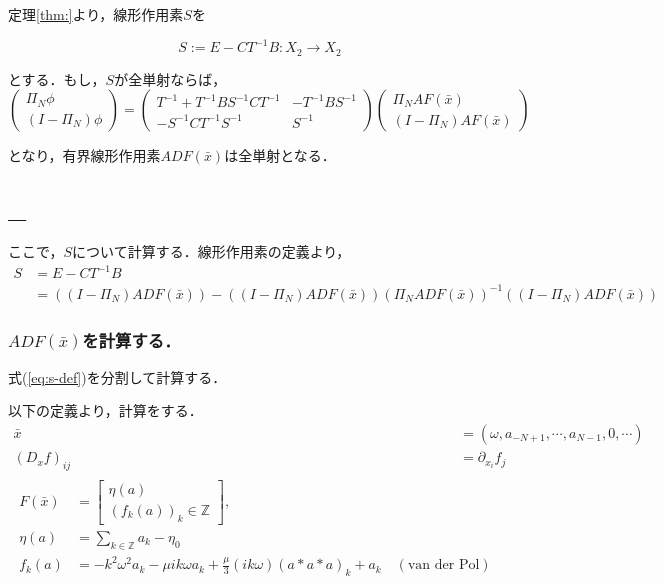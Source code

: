 \documentclass[11pt,a4paper]{jsarticle}
\theoremstyle{definition}
\begin{document}
定理\ref{thm:}より，線形作用素$S$を

\begin{equation}
  S := E-CT^{-1}B:X_2\rightarrow X_2
\end{equation}

とする．もし，$S$が全単射ならば，
\begin{equation*}
  \begin{pmatrix}
    \Pi_N \phi \\
    (I -\Pi_N) \phi
  \end{pmatrix}
  =
  \begin{pmatrix}
    T^{-1}+T^{-1}BS^{-1}CT^{-1} & -T^{-1}BS^{-1} \\
    -S^{-1}CT^{-1} S^{-1} & S^{-1}
  \end{pmatrix}
  \begin{pmatrix}
    \Pi_N A F(\bar{x}) \\
    (I - \Pi_N) A F(\bar{x})
  \end{pmatrix}
\end{equation*}

となり，有界線形作用素$ADF(\bar{x})$は全単射となる．

\subsection*{_}
ここで，$S$について計算する．線形作用素の定義より，
\begin{equation}
  \begin{split}
    S &= E-CT^{-1}B \\
    &= \left( \left( I-\Pi_N \right) ADF ( \bar{x} ) \right) - (\left( I-\Pi_N \right) ADF( \bar{x} )) (\Pi_N ADF(\bar{x}))^{-1} ((I-\Pi_N)ADF(\bar{x}))
  \end{split}
  \label{eq:s-def}
\end{equation}

\subsubsection*{$ADF(\bar{x})$を計算する．}
式(\ref{eq:s-def})を分割して計算する．

以下の定義より，計算をする．
\begin{align}
  \bar{x} &= \left( \omega, a_{-N+1}, \cdots, a_{N-1}, 0, \cdots \right) \\
  (D_xf)_{ij} &= \partial_{x_i} f_j \\
  \begin{split}
    F(\bar{x}) &= \begin{bmatrix}
      \eta(a) \\
      (f_k(a))_k\in \mathbb{Z}
    \end{bmatrix}, \\
    \eta(a) &= \sum_{k\in\mathbb{Z}} a_k - \eta_0 \\
    f_k(a) &= -k^2\omega^2a_k - \mu i k \omega a_k + \frac{\mu}{3}(ik\omega)(a*a*a)_k + a_k\quad (\text{van der Pol})
  \end{split}
\end{align}
\end{document}
